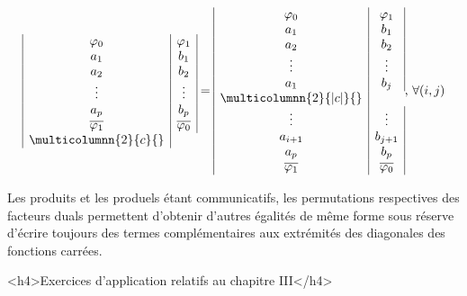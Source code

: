 \[
\begin{array}{|c|c|}  
		\varphi_0  &   \varphi_1  \\
		a_1        &     b_1      \\
		a_2        &     b_2      \\
		\vdots     &    \vdots    \\
		a_p        &    b_p       \\
  \overline{\varphi_1} & \overline{\varphi_0} \\	
\multicolumnn{2}{c}{\vspace*{1.5cm}}  \\	
  \end{array}  =  \begin{array}{|c|c|}  
		\varphi_0  &   \varphi_1  \\
		a_1        &     b_1      \\
		a_2        &     b_2      \\
		\vdots     &    \vdots    \\
		a_1        &    b_j       \\
\multicolumnn{2}{|c|}{}    \\
		\vdots     &    \vdots    \\
		a_{i+1}    &    b_{j +1}  \\
		a_p        &    b_p       \\
  \overline{\varphi_1} & \overline{\varphi_0} \\		
  \end{array} \text{, } \forall (i, j)  
\]





Les produits et les produels étant communicatifs, les permutations respectives des facteurs duals permettent d'obtenir d'autres égalités de même forme sous réserve d'écrire toujours des termes complémentaires aux extrémités des diagonales des fonctions carrées.

<h4>Exercices d'application relatifs au chapitre III</h4>

